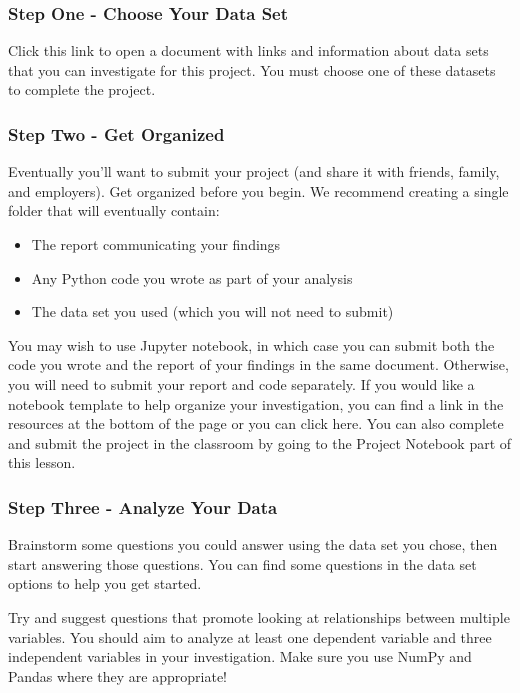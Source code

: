 \documentclass[]{book}
\providecommand{\tightlist}{%
  \setlength{\itemsep}{0pt}\setlength{\parskip}{0pt}}
\begin{document}
\subsubsection{Step One - Choose Your Data
Set}\label{step-one---choose-your-data-set}

Click this link to open a document with links and information about data
sets that you can investigate for this project. You must choose one of
these datasets to complete the project.

\subsubsection{Step Two - Get Organized}\label{step-two---get-organized}

Eventually you'll want to submit your project (and share it with
friends, family, and employers). Get organized before you begin. We
recommend creating a single folder that will eventually contain:

\begin{itemize}
\tightlist
\item
  The report communicating your findings
\item
  Any Python code you wrote as part of your analysis
\item
  The data set you used (which you will not need to submit)
\end{itemize}

You may wish to use Jupyter notebook, in which case you can submit both
the code you wrote and the report of your findings in the same document.
Otherwise, you will need to submit your report and code separately. If
you would like a notebook template to help organize your investigation,
you can find a link in the resources at the bottom of the page or you
can click here. You can also complete and submit the project in the
classroom by going to the Project Notebook part of this lesson.

\subsubsection{Step Three - Analyze Your
Data}\label{step-three---analyze-your-data}

Brainstorm some questions you could answer using the data set you chose,
then start answering those questions. You can find some questions in the
data set options to help you get started.

Try and suggest questions that promote looking at relationships between
multiple variables. You should aim to analyze at least one dependent
variable and three independent variables in your investigation. Make
sure you use NumPy and Pandas where they are appropriate!
\end{document}
